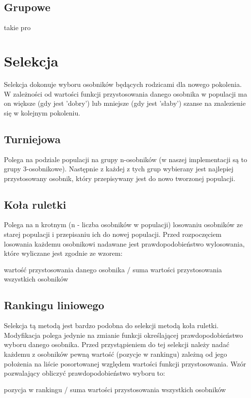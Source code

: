 \documentclass[11pt]{aghdpl}
\begin{document}
\section{Grupowe}
\label{sec:group}
takie pro

\chapter{Selekcja}
\label{cha:selection}
Selekcja dokonuje wyboru osobników będących rodzicami dla nowego pokolenia.
W zależności od wartości funkcji przystosowania danego osobnika w populacji ma on większe (gdy jest 'dobry') lub mniejsze (gdy jest 'słaby') szanse na znalezienie się w kolejnym pokoleniu. 
\section{Turniejowa}
\label{sec:tournament}
Polega na podziale populacji na grupy n-osobników (w naszej implementacji są to grupy 3-osobnikowe). Następnie z każdej z tych grup wybierany jest najlepiej przystosowany osobnik, który przepisywany jest do nowo tworzonej populacji.

\section{Koła ruletki}
\label{sec:roulette}
Polega na n krotnym (n - liczba osobników w populacji) losowaniu osobników ze starej populacji i przepisaniu ich do nowej populacji. Przed rozpoczęciem losowania każdemu osobnikowi nadawane jest prawdopodobieństwo wylosowania, które wyliczane jest zgodnie ze wzorem:
\begin{center}
wartość przystosowania danego osobnika / suma wartości przystosowania wszystkich osobników
\end{center}
 
\section{Rankingu liniowego}
\label{sec:linear}
Selekcja tą metodą jest bardzo podobna do selekcji metodą koła ruletki. Modyfikacja polega jedynie na zmianie funkcji określającej prawdopodobieństwo wyboru danego osobnika. Przed przystąpieniem do tej selekcji należy nadać każdemu z osobników pewną wartość (pozycje w rankingu) zależną od jego położenia na liście posortowanej względem wartości funkcji przystosowania. Wzór pozwalający obliczyć prawdopodobieństwo wyboru to:
\begin{center}
pozycja w rankingu / suma wartości przystosowania wszystkich osobników
\end{center}
\end{document}
